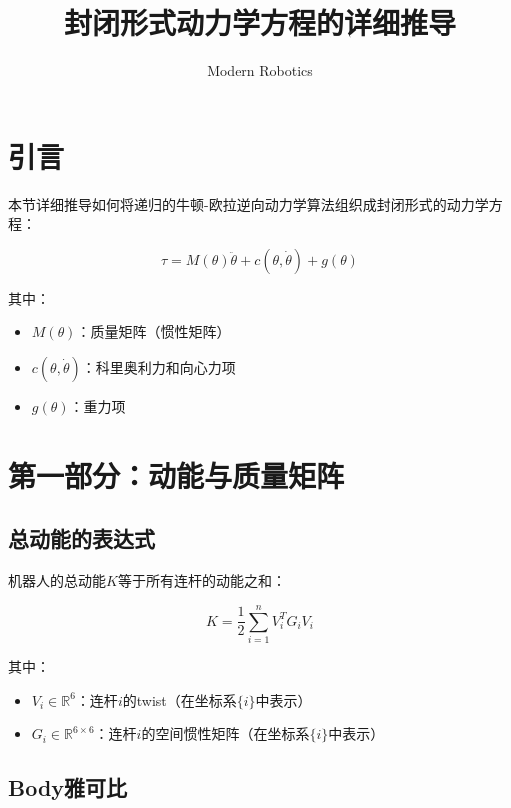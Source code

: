 \documentclass[12pt,a4paper]{article}
\title{封闭形式动力学方程的详细推导}
\author{Modern Robotics}
\date{}
\begin{document}
\maketitle

\tableofcontents
\newpage

\section{引言}

本节详细推导如何将递归的牛顿-欧拉逆向动力学算法组织成封闭形式的动力学方程：

\begin{equation}
\tau = M(\theta)\ddot{\theta} + c(\theta, \dot{\theta}) + g(\theta)
\label{eq:closed_form}
\end{equation}

其中：
\begin{itemize}
\item $M(\theta)$：质量矩阵（惯性矩阵）
\item $c(\theta, \dot{\theta})$：科里奥利力和向心力项
\item $g(\theta)$：重力项
\end{itemize}

\section{第一部分：动能与质量矩阵}

\subsection{总动能的表达式}

机器人的总动能$K$等于所有连杆的动能之和：

\begin{equation}
K = \frac{1}{2}\sum_{i=1}^{n} V_i^T G_i V_i
\label{eq:kinetic_energy_sum}
\end{equation}

其中：
\begin{itemize}
\item $V_i \in \mathbb{R}^6$：连杆$i$的twist（在坐标系$\{i\}$中表示）
\item $G_i \in \mathbb{R}^{6 \times 6}$：连杆$i$的空间惯性矩阵（在坐标系$\{i\}$中表示）
\end{itemize}

\subsection{Body雅可比}
\end{document}
